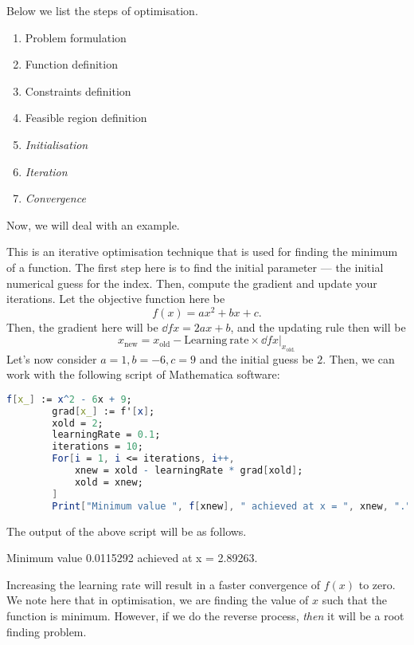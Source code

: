 Below we list the steps of optimisation.

\begin{enumerate}
	\item Problem formulation
	\item Function definition
	\item Constraints definition
	\item Feasible region definition
	\item {\itshape Initialisation}
	\item {\itshape Iteration}
	\item {\itshape Convergence}
\end{enumerate}

Now, we will deal with an example.

\begin{example}
	This is an iterative optimisation technique that is used for finding the minimum of a function. The first step here is to find the initial parameter --- the initial numerical guess for the index. Then, compute the gradient and update your iterations. Let the objective function here be
	$$f(x) = ax^2 + bx + c.$$
	Then, the gradient here will be $\dd fx = 2ax + b$, and the updating rule then will be
	$$x_{\mathrm{new}} = x_{\mathrm{old}} - \mathrm{Learning\ rate} \times \left.\dd fx \right|_{x_{\mathrm{old.}}}$$
	Let's now consider $a = 1, b = -6, c = 9$ and the initial guess be $2$. Then, we can work with the following script of Mathematica software:
	
	\begin{lstlisting}[caption = {Mathematica code for Gradient Descent Method}, language = Mathematica]
		f[x_] := x^2 - 6x + 9;
		grad[x_] := f'[x];
		xold = 2;
		learningRate = 0.1;
		iterations = 10;
		For[i = 1, i <= iterations, i++,
			xnew = xold - learningRate * grad[xold];
			xold = xnew;
		]
		Print["Minimum value ", f[xnew], " achieved at x = ", xnew, "."]
	\end{lstlisting}
	
	\noindent
	The output of the above script will be as follows.
	
	\begin{lstoutput}
		Minimum value 0.0115292 achieved at x = 2.89263.
	\end{lstoutput}
	
	\noindent
	Increasing the learning rate will result in a faster convergence of $f(x)$ to zero.
	We note here that in optimisation, we are finding the value of $x$ such that the function is minimum. However, if we do the reverse process, {\itshape then} it will be a root finding problem.
\end{example}


